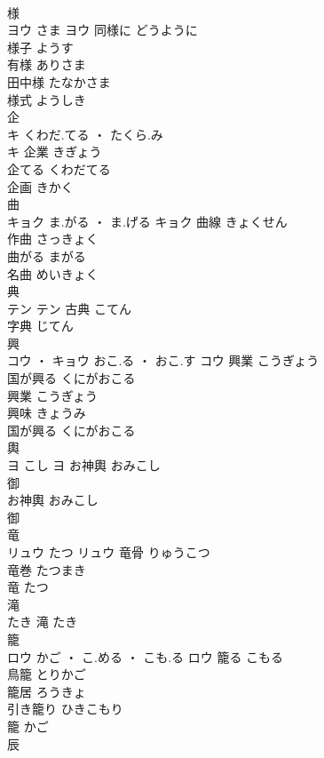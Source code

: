 \documentclass[8pt]{extreport}
\begin{document}
\begin{CJK}{UTF8}{min}
\\	様	
\\	ヨウ	さま	ヨウ	同様に	どうように	
\\	様子	ようす	
\\	有様	ありさま	
\\	田中様	たなかさま	
\\	様式	ようしき	
\\	企	
\\	キ	くわだ.てる ・ たくら.み
\\	キ	企業	きぎょう	
\\	企てる	くわだてる	
\\	企画	きかく	
\\	曲	
\\	キョク	ま.がる ・ ま.げる	キョク	曲線	きょくせん	
\\	作曲	さっきょく	
\\	曲がる	まがる	
\\	名曲	めいきょく	
\\	典	
\\	テン		テン	古典	こてん	
\\	字典	じてん	
\\	興	
\\	コウ ・ キョウ	おこ.る ・ おこ.す	コウ	興業	こうぎょう	
\\	国が興る	くにがおこる	
\\	興業	こうぎょう	
\\	興味	きょうみ	
\\	国が興る	くにがおこる	
\\	輿	
\\	ヨ	こし	ヨ	お神輿	おみこし	
\\	御 
\\	お神輿	おみこし	
\\	御 
\\	竜	
\\	リュウ	たつ	リュウ	竜骨	りゅうこつ	
\\	竜巻	たつまき	
\\	竜	たつ	
\\	滝	
\\	たき														滝	たき	
\\	籠	
\\	ロウ	かご ・ こ.める ・ こも.る	ロウ	籠る	こもる	
\\	鳥籠	とりかご	
\\	籠居	ろうきょ	
\\	引き籠り	ひきこもり	
\\	籠	かご	
\\	辰	

\end{CJK}
\end{document}
